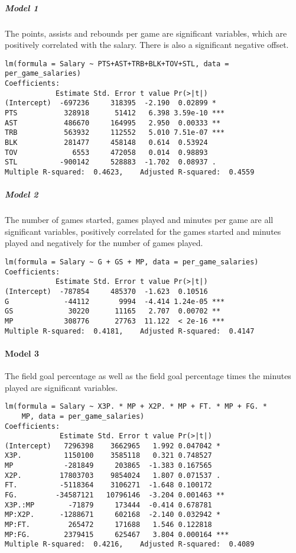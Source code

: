 \subparagraph{Model 1}The points, assists and rebounds per game are significant variables, which are positively correlated with the salary. There is also a significant negative offset.

\begin{verbatim}
lm(formula = Salary ~ PTS+AST+TRB+BLK+TOV+STL, data = per_game_salaries)
Coefficients:
            Estimate Std. Error t value Pr(>|t|)    
(Intercept)  -697236     318395  -2.190  0.02899 *  
PTS           328918      51412   6.398 3.59e-10 ***
AST           486670     164995   2.950  0.00333 ** 
TRB           563932     112552   5.010 7.51e-07 ***
BLK           281477     458148   0.614  0.53924    
TOV             6553     472058   0.014  0.98893    
STL          -900142     528883  -1.702  0.08937 .  
Multiple R-squared:  0.4623,	Adjusted R-squared:  0.4559 
\end{verbatim}

\subparagraph{Model 2}The number of games started, games played and minutes per game are all significant variables, positively correlated for the games started and minutes played and negatively for the number of games played.
\begin{verbatim}
lm(formula = Salary ~ G + GS + MP, data = per_game_salaries)
Coefficients:
            Estimate Std. Error t value Pr(>|t|)    
(Intercept)  -787854     485370  -1.623  0.10516    
G             -44112       9994  -4.414 1.24e-05 ***
GS             30220      11165   2.707  0.00702 ** 
MP            308776      27763  11.122  < 2e-16 ***
Multiple R-squared:  0.4181,	Adjusted R-squared:  0.4147 
\end{verbatim}

\paragraph{Model 3}The field goal percentage as well as the field goal percentage times the minutes played are significant variables.
\begin{verbatim}
lm(formula = Salary ~ X3P. * MP + X2P. * MP + FT. * MP + FG. * 
    MP, data = per_game_salaries)
Coefficients:
             Estimate Std. Error t value Pr(>|t|)    
(Intercept)   7296398    3662965   1.992 0.047042 *  
X3P.          1150100    3585118   0.321 0.748527    
MP            -281849     203865  -1.383 0.167565    
X2P.         17803703    9854024   1.807 0.071537 .  
FT.          -5118364    3106271  -1.648 0.100172    
FG.         -34587121   10796146  -3.204 0.001463 ** 
X3P.:MP        -71879     173444  -0.414 0.678781    
MP:X2P.      -1288671     602168  -2.140 0.032942 *  
MP:FT.         265472     171688   1.546 0.122818    
MP:FG.        2379415     625467   3.804 0.000164 ***
Multiple R-squared:  0.4216,	Adjusted R-squared:  0.4089
\end{verbatim}

